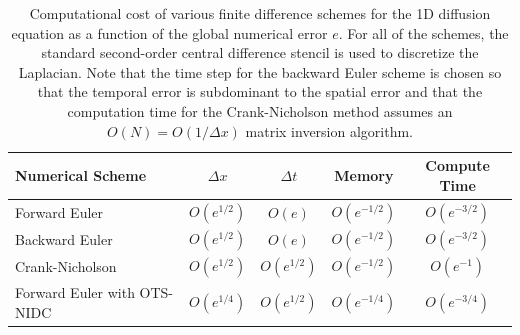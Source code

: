 \documentclass[fleqn,12pt,twoside]{article}
\def\dt{\Delta t}
\def\dx{\Delta x}
\begin{document}
\begin{table}[tb]
\caption{
Computational cost of various finite difference schemes for the 1D 
diffusion equation as a function of the global numerical error $e$.
For all of the schemes, the standard second-order central difference 
stencil is used to discretize the Laplacian.  
Note that the time step for the backward Euler scheme is chosen so that the
temporal error is subdominant to the spatial error and that the computation 
time for the Crank-Nicholson method assumes an $O(N) = O \left( 1/\dx\right)$ 
matrix inversion algorithm. 
}
\label{tab:comp_perf_vs_err} 
\renewcommand{\arraystretch}{1.5}
\centering
\begin{tabular}{lcccc}
  \hline
  {\bf Numerical Scheme} & $\dx$ 
  & $\dt$
  & {\bf Memory}
  & {\bf Compute Time}
  \\
  \hline 
  Forward Euler    & $O\left( e^{1/2} \right)$ 
                   & $O\left( e \right)$ 
                   & $O\left( e^{-1/2} \right)$ 
                   & $O\left( e^{-3/2} \right)$ \\
  Backward Euler   & $O\left( e^{1/2} \right)$ 
                   & $O\left( e \right)$ 
                   & $O\left( e^{-1/2} \right)$ 
                   & $O\left( e^{-3/2} \right)$ \\
  Crank-Nicholson  & $O\left( e^{1/2} \right)$ 
                   & $O\left( e^{1/2} \right)$ 
                   & $O\left( e^{-1/2} \right)$ 
                   & $O\left( e^{-1} \right)$ \\
  Forward Euler with OTS-NIDC & $O\left( e^{1/4} \right)$ 
                   & $O\left( e^{1/2} \right)$ 
                   & $O\left( e^{-1/4} \right)$ 
                   & $O\left( e^{-3/4} \right)$ \\ 
  \hline
\end{tabular}
\end{table}
\end{document}
